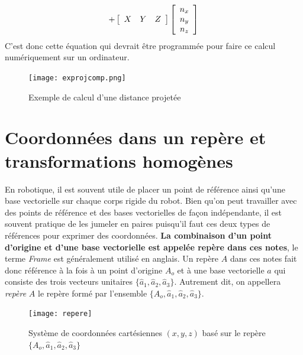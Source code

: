 \begin{example}
\begin{align}
+
\left[ \begin{array}{c c c}
	X & Y & Z  
\end{array}  \right]
 \left[ \begin{array}{c} n_x \\ n_y \\ n_z  \end{array} \right]
\end{align} 
C'est donc cette équation qui devrait être programmée pour faire ce calcul numériquement sur un ordinateur.
\begin{figure}[H]
	\centering
		\texttt{[image: exprojcomp.png]}
	\caption{Exemple de calcul d'une distance projetée}
	\label{fig:exprojcomp}
\end{figure}
\end{example}

\newpage
\section{Coordonnées dans un repère et transformations homogènes}
\label{sec:repere}

En robotique, il est souvent utile de placer un point de référence ainsi qu'une base vectorielle sur chaque corps rigide du robot. Bien qu'on peut travailler avec des points de référence et des bases vectorielles de façon indépendante, il est souvent pratique de les jumeler en paires puisqu'il faut ces deux types de références pour exprimer des coordonnées. \textbf{La combinaison d'un point d'origine et d'une base vectorielle est appelée repère dans ces notes}, le terme \textit{Frame} est généralement utilisé en anglais. Un repère $A$ dans ces notes fait donc référence à la fois à un point d'origine $A_o$ et à une base vectorielle $a$ qui consiste des trois vecteurs unitaires $\{ \hat{a}_1, \hat{a}_2, \hat{a}_3 \}$. Autrement dit, on appellera \textit{repère} $A$ le repère formé par l'ensemble $\{ A_o, \hat{a}_1, \hat{a}_2, \hat{a}_3 \}$. 
\begin{figure}[H]
	\centering
		\texttt{[image: repere]}
	\caption{Système de coordonnées cartésiennes $(x,y,z)$ basé sur le repère $\{A_o,\hat{a}_1,\hat{a}_2,\hat{a}_3\}$}
	\label{fig:repere}
\end{figure}

